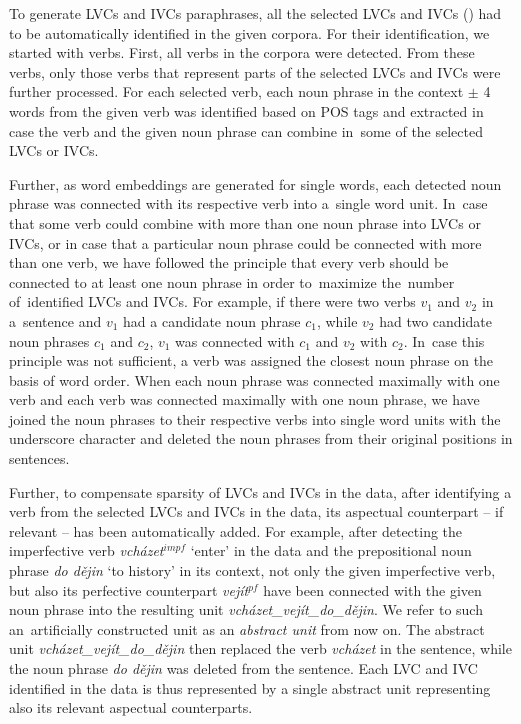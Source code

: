 \documentclass[output=paper
,modfonts
,nonflat]{langsci/langscibook}
\begin{document}
To generate LVCs and IVCs paraphrases, all the selected LVCs and IVCs () had to be automatically identified in the given corpora. 
For their identification, we started with verbs. First, all verbs in the 
corpora were detected. From these verbs, only those verbs that represent 
parts of the selected LVCs and IVCs were further processed. 
For each selected verb, each noun phrase in the context $\pm$ 4 words
from the given verb was identified based on POS tags and extracted 
in case the verb and the given noun phrase can combine in~some of the selected 
LVCs or IVCs.

Further, as word embeddings are generated for single words, each detected noun 
phrase was connected with its respective verb into a~single word unit. In~case 
that some verb could combine with more than one noun phrase into LVCs or IVCs, 
or in case that a particular noun phrase could be connected with more than one 
verb, we have followed the principle that every verb should be connected to at 
least one noun phrase  in order to~maximize the~number of~identified LVCs and 
IVCs. 
For example, if there were two verbs $v_1$ and $v_2$ in a~sentence and $v_1$ 
had a candidate noun phrase $c_1$, while $v_2$ had two candidate noun phrases 
$c_1$ and $c_2$,  $v_1$ was connected with $c_1$ and $v_2$ with $c_2$. In~case 
this principle was not sufficient, a verb was assigned the closest noun phrase 
on the basis of word order. When each noun phrase was connected maximally with 
one verb and each verb was connected maximally with one noun phrase, we have 
joined the noun phrases to their respective verbs into single word units with 
the underscore character and deleted the noun phrases from their original 
positions in sentences.

Further, to compensate sparsity of LVCs and IVCs in the data, after identifying 
a verb from the selected LVCs and IVCs in the data, its aspectual counterpart 
-- if relevant -- has been automatically added. For example, after detecting 
the imperfective verb \textit{vcházet}$^{impf}$ `enter' in the data and the 
prepositional noun phrase \textit{do dějin} `to history' in its context, not 
only the given imperfective verb, but also its perfective counterpart 
\textit{vejít}$^{pf}$ have been connected with the given noun phrase into the 
resulting unit \textit{vcházet\_vejít\_do\_dějin}. We refer to such 
an~artificially constructed unit as an \emph{abstract unit} from now on. The 
abstract unit \textit{vcházet\_vejít\_do\_dějin} then replaced the verb 
\textit{vcházet} in the sentence, while the noun phrase \textit{do dějin} 
was deleted from the sentence. Each LVC and IVC identified in the data is thus 
represented by a single abstract unit representing also its relevant aspectual 
counterparts. 
\end{document}
